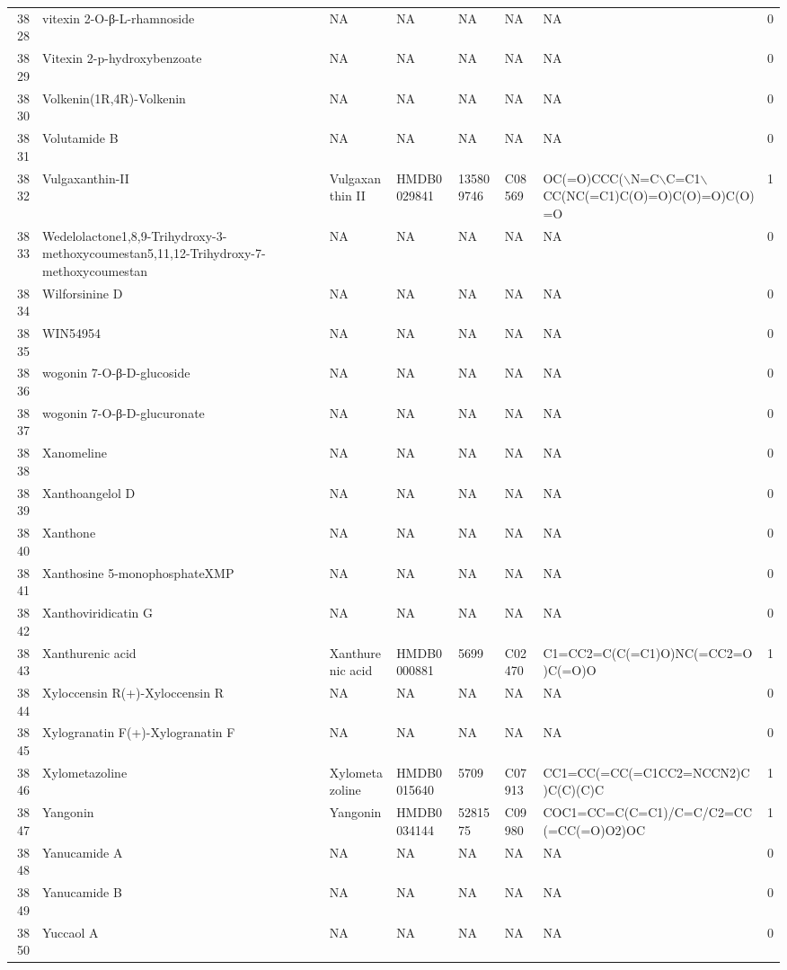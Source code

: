 \documentclass[a4paper]{article}
\begin{document}
\begin{longtable}{rlllllll}
  3828 & vitexin 2-O-β-L-rhamnoside & NA & NA & NA & NA & NA & 0 \\ 
  3829 & Vitexin 2-p-hydroxybenzoate & NA & NA & NA & NA & NA & 0 \\ 
  3830 & Volkenin(1R,4R)-Volkenin & NA & NA & NA & NA & NA & 0 \\ 
  3831 & Volutamide B & NA & NA & NA & NA & NA & 0 \\ 
  3832 & Vulgaxanthin-II & Vulgaxanthin II & HMDB0029841 & 135809746 & C08569 & OC(=O)CCC($\backslash$N=C$\backslash$C=C1$\backslash$CC(NC(=C1)C(O)=O)C(O)=O)C(O)=O & 1 \\ 
  3833 & Wedelolactone1,8,9-Trihydroxy-3-methoxycoumestan5,11,12-Trihydroxy-7-methoxycoumestan & NA & NA & NA & NA & NA & 0 \\ 
  3834 & Wilforsinine D & NA & NA & NA & NA & NA & 0 \\ 
  3835 & WIN54954 & NA & NA & NA & NA & NA & 0 \\ 
  3836 & wogonin 7-O-β-D-glucoside & NA & NA & NA & NA & NA & 0 \\ 
  3837 & wogonin 7-O-β-D-glucuronate & NA & NA & NA & NA & NA & 0 \\ 
  3838 & Xanomeline & NA & NA & NA & NA & NA & 0 \\ 
  3839 & Xanthoangelol D & NA & NA & NA & NA & NA & 0 \\ 
  3840 & Xanthone & NA & NA & NA & NA & NA & 0 \\ 
  3841 & Xanthosine 5-monophosphateXMP & NA & NA & NA & NA & NA & 0 \\ 
  3842 & Xanthoviridicatin G & NA & NA & NA & NA & NA & 0 \\ 
  3843 & Xanthurenic acid & Xanthurenic acid & HMDB0000881 & 5699 & C02470 & C1=CC2=C(C(=C1)O)NC(=CC2=O)C(=O)O & 1 \\ 
  3844 & Xyloccensin R(+)-Xyloccensin R & NA & NA & NA & NA & NA & 0 \\ 
  3845 & Xylogranatin F(+)-Xylogranatin F & NA & NA & NA & NA & NA & 0 \\ 
  3846 & Xylometazoline & Xylometazoline & HMDB0015640 & 5709 & C07913 & CC1=CC(=CC(=C1CC2=NCCN2)C)C(C)(C)C & 1 \\ 
  3847 & Yangonin & Yangonin & HMDB0034144 & 5281575 & C09980 & COC1=CC=C(C=C1)/C=C/C2=CC(=CC(=O)O2)OC & 1 \\ 
  3848 & Yanucamide A & NA & NA & NA & NA & NA & 0 \\ 
  3849 & Yanucamide B & NA & NA & NA & NA & NA & 0 \\ 
  3850 & Yuccaol A & NA & NA & NA & NA & NA & 0 \\ 

\end{longtable}
\end{document}
